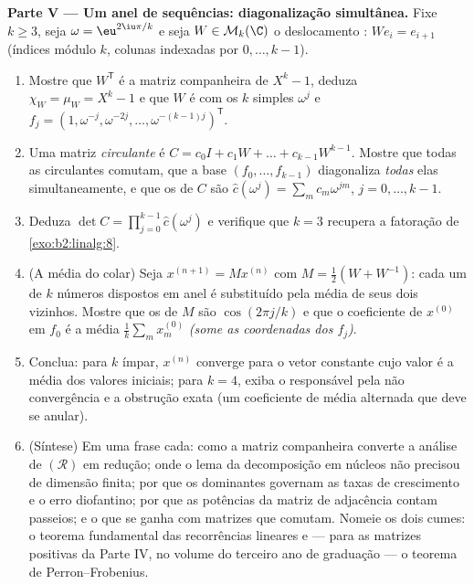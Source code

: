 \begin{problem}
\medskip
\noindent\textbf{Parte V --- Um anel de sequências: diagonalização
simultânea.} Fixe $k \geq 3$, seja $\omega = \eu^{2\iu\pi/k}$
e seja $W \in \mathcal{M}_k(\C)$ o deslocamento : $W e_i =
e_{i+1}$ (índices módulo $k$, colunas indexadas por $0, \dots, k-1$).
\begin{enumerate}[resume]
  \item Mostre que $W^{\mathsf T}$ é a matriz companheira de
        $X^k - 1$, deduza $\chi_W = \mu_W = X^k - 1$ e que $W$ é
         com os $k$  simples
        $\omega^j$ e  $f_j = (1, \omega^{-j},
        \omega^{-2j}, \dots, \omega^{-(k-1)j})^{\mathsf T}$.
  \item Uma matriz \emph{circulante} é $C = c_0 I + c_1 W + \dots
        + c_{k-1}W^{k-1}$. Mostre que todas as circulantes comutam,
        que a base $(f_0, \dots, f_{k-1})$ diagonaliza
        \emph{todas} elas simultaneamente, e que os
         de $C$ são $\widehat c(\omega^j) = \sum_m
        c_m \omega^{jm}$, $j = 0, \dots, k-1$.
  \item Deduza $\det C = \prod_{j=0}^{k-1} \widehat
        c(\omega^j)$ e verifique que $k = 3$ recupera a
        fatoração de \cref{exo:b2:linalg:8}.
  \item (A média do colar) Seja $x^{(n+1)} = Mx^{(n)}$ com
        $M = \frac12(W + W^{-1})$: cada um de $k$ números dispostos
        em anel é substituído pela média de seus dois
        vizinhos. Mostre que os  de $M$ são
        $\cos(2\pi j/k)$ e que o coeficiente de $x^{(0)}$
        em $f_0$ é a média $\frac1k\sum_m x^{(0)}_m$
        \emph{(some as coordenadas dos $f_j$)}.
  \item Conclua: para $k$ ímpar, $x^{(n)}$ converge para o
        vetor constante cujo valor é a média dos valores
        iniciais; para $k = 4$, exiba o  responsável
        pela não convergência e a obstrução exata
        (um coeficiente de média alternada que deve se anular).
  \item (Síntese) Em uma frase cada: como a matriz
        companheira converte a análise de $(\mathcal R)$ em
        redução; onde o lema da decomposição em núcleos não precisou
        de dimensão finita; por que os  dominantes governam
        as taxas de crescimento e o erro diofantino; por que as potências da
        matriz de adjacência contam passeios; e o que se ganha com
        matrizes que comutam. Nomeie os dois cumes: o teorema
        fundamental das recorrências lineares e --- para as matrizes
        positivas da Parte IV, no volume do terceiro ano de graduação --- o
        teorema de Perron--Frobenius.
\end{enumerate}
\end{problem}
